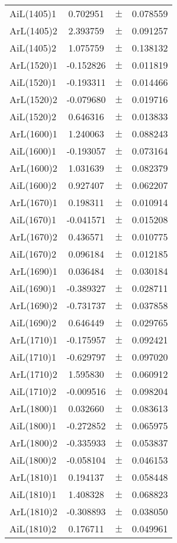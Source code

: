 \begin{table}
\begin{tiny}
\begin{tabular}{lccc}
AiL(1405)1 & 0.702951 & $\pm$ & 0.078559 \\
ArL(1405)2 & 2.393759 & $\pm$ & 0.091257 \\
AiL(1405)2 & 1.075759 & $\pm$ & 0.138132 \\
ArL(1520)1 & -0.152826 & $\pm$ & 0.011819 \\
AiL(1520)1 & -0.193311 & $\pm$ & 0.014466 \\
ArL(1520)2 & -0.079680 & $\pm$ & 0.019716 \\
AiL(1520)2 & 0.646316 & $\pm$ & 0.013833 \\
ArL(1600)1 & 1.240063 & $\pm$ & 0.088243 \\
AiL(1600)1 & -0.193057 & $\pm$ & 0.073164 \\
ArL(1600)2 & 1.031639 & $\pm$ & 0.082379 \\
AiL(1600)2 & 0.927407 & $\pm$ & 0.062207 \\
ArL(1670)1 & 0.198311 & $\pm$ & 0.010914 \\
AiL(1670)1 & -0.041571 & $\pm$ & 0.015208 \\
ArL(1670)2 & 0.436571 & $\pm$ & 0.010775 \\
AiL(1670)2 & 0.096184 & $\pm$ & 0.012185 \\
ArL(1690)1 & 0.036484 & $\pm$ & 0.030184 \\
AiL(1690)1 & -0.389327 & $\pm$ & 0.028711 \\
ArL(1690)2 & -0.731737 & $\pm$ & 0.037858 \\
AiL(1690)2 & 0.646449 & $\pm$ & 0.029765 \\
ArL(1710)1 & -0.175957 & $\pm$ & 0.092421 \\
AiL(1710)1 & -0.629797 & $\pm$ & 0.097020 \\
ArL(1710)2 & 1.595830 & $\pm$ & 0.060912 \\
AiL(1710)2 & -0.009516 & $\pm$ & 0.098204 \\
ArL(1800)1 & 0.032660 & $\pm$ & 0.083613 \\
AiL(1800)1 & -0.272852 & $\pm$ & 0.065975 \\
ArL(1800)2 & -0.335933 & $\pm$ & 0.053837 \\
AiL(1800)2 & -0.058104 & $\pm$ & 0.046153 \\
ArL(1810)1 & 0.194137 & $\pm$ & 0.058448 \\
AiL(1810)1 & 1.408328 & $\pm$ & 0.068823 \\
ArL(1810)2 & -0.308893 & $\pm$ & 0.038050 \\
AiL(1810)2 & 0.176711 & $\pm$ & 0.049961 \\

\end{tabular}
\end{tiny}
\end{table}

